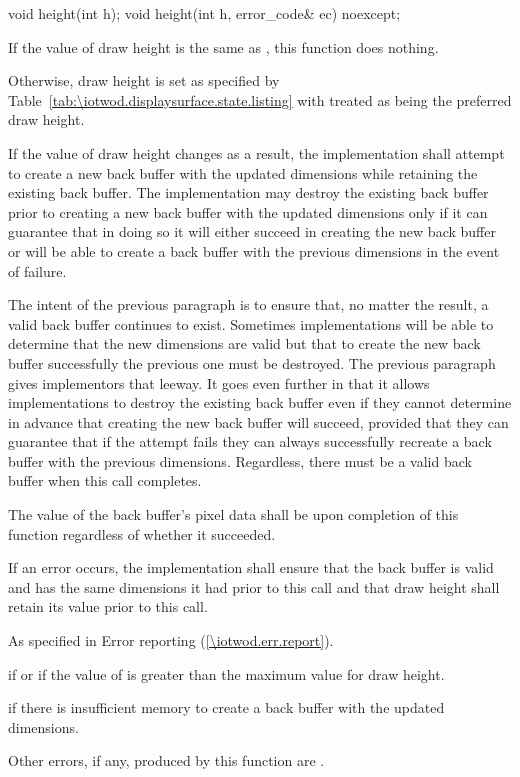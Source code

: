 \begin{itemdecl}
void height(int h);
void height(int h, error_code& ec) noexcept;
\end{itemdecl}
\begin{itemdescr}
\pnum
\effects
If the value of draw height is the same as , this function does nothing.

\pnum
Otherwise, draw height is set as specified by Table~\ref{tab:\iotwod.displaysurface.state.listing} with  treated as being the preferred draw height.

\pnum
If the value of draw height changes as a result, the implementation shall attempt to create a new back buffer with the updated dimensions while retaining the existing back buffer. The implementation may destroy the existing back buffer prior to creating a new back buffer with the updated dimensions only if it can guarantee that in doing so it will either succeed in creating the new back buffer or will be able to create a back buffer with the previous dimensions in the event of failure.

\pnum
\begin{note}
The intent of the previous paragraph is to ensure that, no matter the result, a valid back buffer continues to exist. Sometimes implementations will be able to determine that the new dimensions are valid but that to create the new back buffer successfully the previous one must be destroyed. The previous paragraph gives implementors that leeway. It goes even further in that it allows implementations to destroy the existing back buffer even if they cannot determine in advance that creating the new back buffer will succeed, provided that they can guarantee that if the attempt fails they can always successfully recreate a back buffer with the previous dimensions. Regardless, there must be a valid back buffer when this call completes.
\end{note}

\pnum
The value of the back buffer's pixel data shall be \unspecnorm upon completion of this function regardless of whether it succeeded.

\pnum
If an error occurs, the implementation shall ensure that the back buffer is valid and has the same dimensions it had prior to this call and that draw height shall retain its value prior to this call.

\pnum
\throws
As specified in Error reporting (\ref{\iotwod.err.report}).

\pnum
\errors
{} if  or if the value of  is greater than the maximum value for draw height.

 if there is insufficient memory to create a back buffer with the updated dimensions.

Other errors, if any, produced by this function are .
\end{itemdescr}

